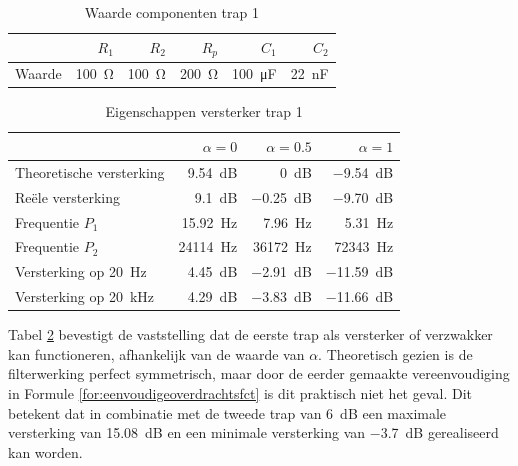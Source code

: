 \documentclass{report}
\begin{document}
\begin{table}[h]
    \centering

    \begin{tabular}{lrrrrr}
    \toprule
    & $R_1$ & $R_2$ & $R_p$ & $C_1$ & $C_2$ \\
    \midrule
    Waarde & \SI{100}{\ohm} & \SI{100}{\ohm} &  \SI{200}{\ohm} & \SI{100}{\micro\farad} & \SI{22}{\nano\farad} \\
    \bottomrule
    \end{tabular}
    \caption{Waarde componenten trap 1}
    \label{comp1}
\end{table}

\begin{table}[h]
    \centering
    \begin{tabular}{lrrr}
    \toprule
    & $\alpha = 0$ & $\alpha = 0.5$ & $\alpha = 1$ \\
    \midrule
    Theoretische versterking & \SI{9.54}{\deci\bel} & \SI{0}{\deci\bel} & \SI{-9.54}{\deci\bel} \\
    Reële versterking & \SI{9.1}{\deci\bel} & \SI{-0.25}{\deci\bel} & \SI{-9.70}{\deci\bel} \\
    Frequentie $P_1$ & \SI{15.92}{\hertz} & \SI{7.96}{\hertz} & \SI{5.31}{\hertz} \\
    Frequentie $P_2$ & \SI{24114}{\hertz} & \SI{36172}{\hertz} & \SI{72343}{\hertz} \\
    Versterking op \SI{20}{\hertz}& \SI{4.45}{\deci\bel} & \SI{-2.91}{\deci\bel} & \SI{-11.59}{\deci\bel} \\
    Versterking op \SI{20}{\kilo\hertz}& \SI{4.29}{\deci\bel} & \SI{-3.83}{\deci\bel} & \SI{-11.66}{\deci\bel} \\
    \bottomrule
    \end{tabular}
    \caption{Eigenschappen versterker trap 1}
    \label{eig1}
\end{table}

Tabel \ref{eig1} bevestigt de vaststelling dat de eerste trap als versterker of verzwakker kan functioneren, afhankelijk van de waarde van $\alpha$. Theoretisch gezien is de filterwerking perfect symmetrisch, maar door de eerder gemaakte vereenvoudiging in Formule \ref{for:eenvoudigeoverdrachtsfct} is dit praktisch niet het geval. Dit betekent dat in combinatie met de tweede trap van \SI{6}{\deci\bel} een maximale versterking van \SI{15.08}{\deci\bel} en een minimale versterking van \SI{-3.7}{\deci\bel} gerealiseerd kan worden.
\end{document}
